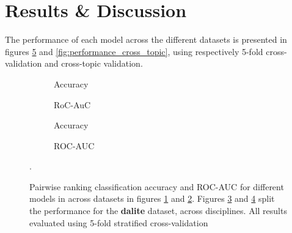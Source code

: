 \documentclass[runningheads]{llncs}
\begin{document}
\section{Results \& Discussion}

The performance of each model across the different datasets is presented 
in figures \ref{fig:performance_k_fold} and \ref{fig:performance_cross_topic}, 
using respectively 5-fold cross-validation and cross-topic validation.  

\begin{figure}
	\begin{subfigure}[t]{0.5\linewidth}
		\centering
		\scalebox{0.5}{}
		\caption{Accuracy}
		\label{fig:acc_kfold}
	\end{subfigure}%
	\qquad
	\begin{subfigure}[t]{0.5\linewidth}
		\centering
		\scalebox{0.5}{}
		\caption{RoC-AuC}
		\label{fig:AUC_kfold}
	\end{subfigure}
	
	\begin{subfigure}[t]{0.5\linewidth}
		\centering
		\scalebox{0.5}{}
		\caption{Accuracy}
		\label{fig:acc_dalite_kfold}
	\end{subfigure}%
	\qquad
	\begin{subfigure}[t]{0.5\linewidth}
		\centering
		\scalebox{0.5}{}
		\caption{ROC-AUC}
		\label{fig:AUC_dalite_kfold}
	\end{subfigure}	
	\caption{Pairwise ranking classification accuracy and ROC-AUC for 
		different models in across datasets in figures \ref{fig:acc_kfold} and 
		\ref{fig:AUC_kfold}. Figures \ref{fig:acc_dalite_kfold} and 
		\ref{fig:AUC_dalite_kfold} split the performance for the  
		\textbf{dalite} dataset, across disciplines. 
		All results evaluated using 5-fold stratified cross-validation}.
	\label{fig:performance_k_fold}
\end{figure}
\end{document}
